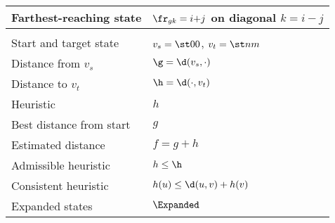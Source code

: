 \begin{minipage}[t]{\columnwidth}
\begin{tabular}[t]{ll}
  \tabindent Farthest-reaching state & $\fr_{gk} = i{+}j$ on diagonal $k{=}i{-}j$ \\
  \midrule
  \textbf{\A} & \\
  \tabindent Start and target state & $v_s = \st 00$, $v_t = \st nm$ \\
  \tabindent Distance from $v_s$ & $\g = \d(v_s, \cdot)$\\
  \tabindent Distance to $v_t$& $\h = \d(\cdot, v_t)$\\
  \tabindent Heuristic & $h$\\
  \tabindent Best distance from start & $g$  \\
  \tabindent Estimated distance & $f = g + h$\\
  \tabindent Admissible heuristic & $h \leq \h$\\
  \tabindent Consistent heuristic & $h(u) \leq \d(u,v) + h(v)$\\
  \tabindent Expanded states & $\Expanded$\\
  \bottomrule
\end{tabular}
\end{minipage}%
